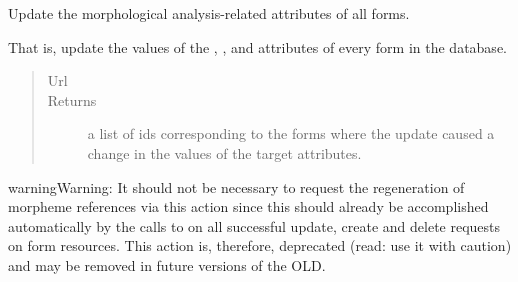 \documentclass[letterpaper,10pt,english]{sphinxmanual}
\begin{document}
\begin{fulllineitems}
\begin{fulllineitems}
\begin{quote}
\begin{description}
\end{description}\end{quote}

\end{fulllineitems}


\begin{fulllineitems}
\label{api:onlinelinguisticdatabase.controllers.forms.FormsController.update_morpheme_references}
Update the morphological analysis-related attributes of all forms.

That is, update the values of the ,
,  and
 attributes of every form in the database.
\begin{quote}\begin{description}
\item[{Url }] \leavevmode
{}

\item[{Returns}] \leavevmode
a list of ids corresponding to the forms where the update
caused a change in the values of the target attributes.

\end{description}\end{quote}

\begin{notice}{warning}{Warning:}
It should not be necessary to request the regeneration of morpheme
references via this action since this should already be accomplished
automatically by the calls to
 on all successful
update, create and delete requests on form resources.  This action
is, therefore, deprecated (read: use it with caution) and may be
removed in future versions of the OLD.
\end{notice}

\end{fulllineitems}


\end{fulllineitems}

\end{document}
